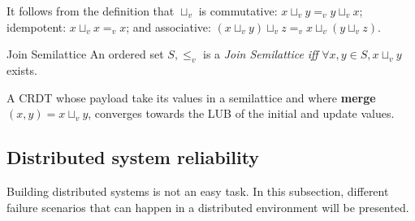 It follows from the definition that $\sqcup_v$ is commutative: $x \sqcup_v y =_v y \sqcup_v x$; idempotent:
$x \sqcup_v x =_v x$; and associative: $(x \sqcup_v y) \sqcup_v z =_v x \sqcup_v (y \sqcup_v z)$.


\begin{definition}{Join Semilattice}
  An ordered set ${S, \leq_v}$ is a \textit{Join Semilattice} \textit{iff}
  $\forall x, y \in S, x \sqcup_v y$ exists.
\end{definition}

A \acs{CRDT} whose payload take its values in a semilattice and where
\textbf{merge}$(x,y) = x \sqcup_v y$, converges towards the LUB of the initial
and update values.

\subsection{Distributed system reliability}

Building distributed systems is not an easy task. In this subsection, different
failure scenarios that can happen in a distributed environment will be presented.

